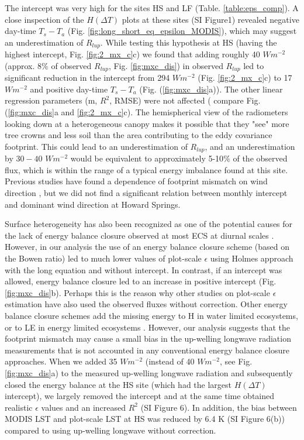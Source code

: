 \documentclass[fleqn,10pt]{wlscirep}
\begin{document}
 The intercept was very high for the sites HS and LF (Table. \ref{table:eps_comp}). A close inspection of the $H(\Delta T)$ plots at these sites (SI Figure1) revealed negative day-time $T_{s} -T_{a}$ (Fig. \ref{fig:long_short_eq_epsilon_MODIS}), which may suggest an underestimation of $R_{lup}$. While testing this hypothesis at HS (having the highest intercept, Fig. \ref{fig:2_mx_c}c) we found that  adding roughly 40 $Wm^{-2}$ (approx. 8\% of observed $R_{lup}$, Fig. \ref{fig:mxc_dis}) in observed $R_{lup}$ led to significant reduction in the intercept from 294 $Wm^{-2}$ (Fig. \ref{fig:2_mx_c}c) to 17 $Wm^{-2}$ and positive day-time $T_{s} - T_{a}$ (Fig. (\ref{fig:mxc_dis}a)). The other linear regression parameters (m, $R^{2}$, RMSE) were not affected ( compare Fig. (\ref{fig:mxc_dis}a and \ref{fig:2_mx_c}c). The hemispherical view of the radiometers looking down at a heterogeneous canopy makes it possible that they "see" more tree crowns and less soil than the area contributing to the eddy covariance footprint. This could lead to an underestimation of $R_{lup}$, and an underestimation by $30-40$ $Wm^{-2}$ would be equivalent to approximately 5-10$\%$ of the observed flux, which is within the range of a typical energy imbalance found at this site. Previous studies have found a dependence of footprint mismatch on wind direction \cite{chu2021representativeness,marcolla2018geometry,morillas2013using}, but we did not find a significant relation between monthly intercept and dominant wind direction at Howard Springs.
 
Surface heterogeneity has also been recognized as one of the potential causes for the lack of energy balance closure observed at most ECS at diurnal scales \cite{wilson2002energy, stoy2013data}. However, in our analysis the use of an energy balance closure scheme (based on the Bowen ratio) led to much lower values of plot-scale $\epsilon$ using Holmes approach with the long equation and without intercept. In contrast, if an intercept was allowed, energy balance closure led to an increase in positive intercept (Fig. \ref{fig:mxc_dis}b). Perhaps this is the reason why other studies on plot-scale $\epsilon$ estimation have also used the observed fluxes without correction\cite{holmes2009land,holmes2016cloud,maes2019potential}. Other energy balance closure schemes add the missing energy to H in water limited ecosystems\cite{twine2000correcting}, or to LE in energy limited ecosystems \cite{chakraborty2019biases}. 
However, our analysis suggests that the footprint mismatch may cause a small bias in the up-welling longwave radiation measurements that is not accounted in any conventional energy balance closure approaches. When we added 35 $Wm^{-2}$ (instead of 40 $Wm^{-2}$, see Fig. \ref{fig:mxc_dis}a) to the measured up-welling longwave radiation and subsequently closed the energy balance at the HS site (which had the largest $H(\Delta T)$ intercept), we largely removed the intercept and at the same time obtained realistic $\epsilon$ values and an increased $R^2$ (SI Figure 6). In addition, the bias between MODIS LST and plot-scale LST at HS was reduced by 6.4 K (SI Figure 6(b)) compared to using up-welling longwave without correction. 
 
\end{document}
